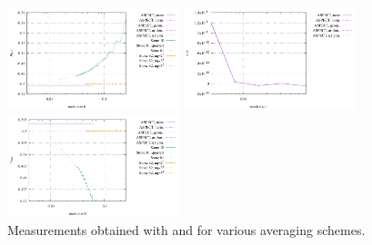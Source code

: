 \begin{center}
\includegraphics[width=5cm]{images/stokes_sphere3D/pressure_min_NS}
\includegraphics[width=5cm]{images/stokes_sphere3D/pressure_mean_NS}
\includegraphics[width=5cm]{images/stokes_sphere3D/pressure_max_NS}\\
{\captionfont Measurements obtained with \aspect and  for various averaging schemes.}
\end{center}

